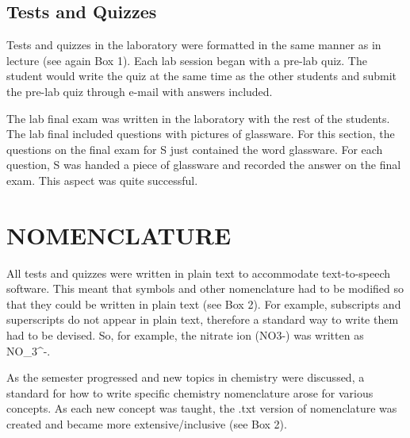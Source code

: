 \documentclass[11.5pt]{sig-alternate} %
\begin{document}
\begin{large}
\subsection*{Tests and Quizzes}

Tests and quizzes in the laboratory were formatted in the same manner as in lecture (see again Box 1).  Each lab session began with a pre-lab quiz.  The student would write the quiz at the same time as the other students and submit the pre-lab quiz through e-mail with answers included.

The lab final exam was written in the laboratory with the rest of the students.  The lab final included questions with pictures of glassware.  For this section, the questions on the final exam for S just contained the word glassware.  For each question, S was handed a piece of glassware and recorded the answer on the final exam.  This aspect was quite successful. 

\section*{NOMENCLATURE}

All tests and quizzes were written in plain text to accommodate text-to-speech software.  This meant that symbols and other nomenclature had to be modified so that they could be written in plain text (see Box 2).  For example, subscripts and superscripts do not appear in plain text, therefore a standard way to write them had to be devised.  So, for example, the nitrate ion 
(NO3-) was written as NO\_3\^{}-.

As the semester progressed and new topics in chemistry were discussed, a standard for how to write specific chemistry nomenclature arose for various concepts.  As each new concept was taught, the .txt version of nomenclature was created and became more extensive/inclusive (see Box 2).  


\end{large}
\end{document}
